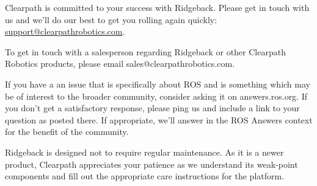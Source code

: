 \documentclass[]{clearpath-latex/clearpath-manual}
\begin{document}
Clearpath is committed to your success with Ridgeback. Please get in touch with us and we’ll do our best to get
you rolling again quickly: \url{support@clearpathrobotics.com}.

To get in touch with a salesperson regarding Ridgeback or other Clearpath Robotics products, please email
sales@clearpathrobotics.com.

If you have a an issue that is specifically about ROS and is something which may be of interest to the broader
community, consider asking it on answers.ros.org. If you don’t get a satisfactory response, please ping us and
include a link to your question as posted there. If appropriate, we’ll answer in the ROS Answers context for
the benefit of the community.

Ridgeback is designed not to require regular maintenance. As it is a newer product, Clearpath appreciates your
patience as we understand its weak-point components and fill out the appropriate care instructions for the
platform.
\end{document}
